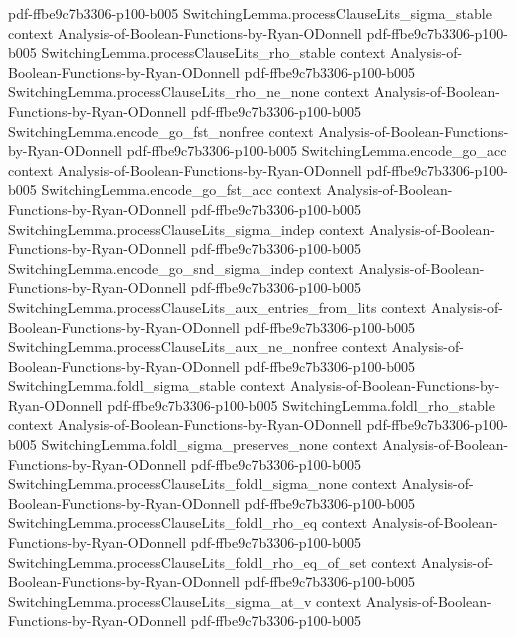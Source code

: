 \begin{lemma}
  {pdf-ffbe9c7b3306-p100-b005}
\proofstep
  {SwitchingLemma.processClauseLits_sigma_stable}
  {context}
  {Analysis-of-Boolean-Functions-by-Ryan-ODonnell}
  {pdf-ffbe9c7b3306-p100-b005}
\proofstep
  {SwitchingLemma.processClauseLits_rho_stable}
  {context}
  {Analysis-of-Boolean-Functions-by-Ryan-ODonnell}
  {pdf-ffbe9c7b3306-p100-b005}
\proofstep
  {SwitchingLemma.processClauseLits_rho_ne_none}
  {context}
  {Analysis-of-Boolean-Functions-by-Ryan-ODonnell}
  {pdf-ffbe9c7b3306-p100-b005}
\proofstep
  {SwitchingLemma.encode_go_fst_nonfree}
  {context}
  {Analysis-of-Boolean-Functions-by-Ryan-ODonnell}
  {pdf-ffbe9c7b3306-p100-b005}
\proofstep
  {SwitchingLemma.encode_go_acc}
  {context}
  {Analysis-of-Boolean-Functions-by-Ryan-ODonnell}
  {pdf-ffbe9c7b3306-p100-b005}
\proofstep
  {SwitchingLemma.encode_go_fst_acc}
  {context}
  {Analysis-of-Boolean-Functions-by-Ryan-ODonnell}
  {pdf-ffbe9c7b3306-p100-b005}
\proofstep
  {SwitchingLemma.processClauseLits_sigma_indep}
  {context}
  {Analysis-of-Boolean-Functions-by-Ryan-ODonnell}
  {pdf-ffbe9c7b3306-p100-b005}
\proofstep
  {SwitchingLemma.encode_go_snd_sigma_indep}
  {context}
  {Analysis-of-Boolean-Functions-by-Ryan-ODonnell}
  {pdf-ffbe9c7b3306-p100-b005}
\proofstep
  {SwitchingLemma.processClauseLits_aux_entries_from_lits}
  {context}
  {Analysis-of-Boolean-Functions-by-Ryan-ODonnell}
  {pdf-ffbe9c7b3306-p100-b005}
\proofstep
  {SwitchingLemma.processClauseLits_aux_ne_nonfree}
  {context}
  {Analysis-of-Boolean-Functions-by-Ryan-ODonnell}
  {pdf-ffbe9c7b3306-p100-b005}
\proofstep
  {SwitchingLemma.foldl_sigma_stable}
  {context}
  {Analysis-of-Boolean-Functions-by-Ryan-ODonnell}
  {pdf-ffbe9c7b3306-p100-b005}
\proofstep
  {SwitchingLemma.foldl_rho_stable}
  {context}
  {Analysis-of-Boolean-Functions-by-Ryan-ODonnell}
  {pdf-ffbe9c7b3306-p100-b005}
\proofstep
  {SwitchingLemma.foldl_sigma_preserves_none}
  {context}
  {Analysis-of-Boolean-Functions-by-Ryan-ODonnell}
  {pdf-ffbe9c7b3306-p100-b005}
\proofstep
  {SwitchingLemma.processClauseLits_foldl_sigma_none}
  {context}
  {Analysis-of-Boolean-Functions-by-Ryan-ODonnell}
  {pdf-ffbe9c7b3306-p100-b005}
\proofstep
  {SwitchingLemma.processClauseLits_foldl_rho_eq}
  {context}
  {Analysis-of-Boolean-Functions-by-Ryan-ODonnell}
  {pdf-ffbe9c7b3306-p100-b005}
\proofstep
  {SwitchingLemma.processClauseLits_foldl_rho_eq_of_set}
  {context}
  {Analysis-of-Boolean-Functions-by-Ryan-ODonnell}
  {pdf-ffbe9c7b3306-p100-b005}
\proofstep
  {SwitchingLemma.processClauseLits_sigma_at_v}
  {context}
  {Analysis-of-Boolean-Functions-by-Ryan-ODonnell}
  {pdf-ffbe9c7b3306-p100-b005}

\end{lemma}
